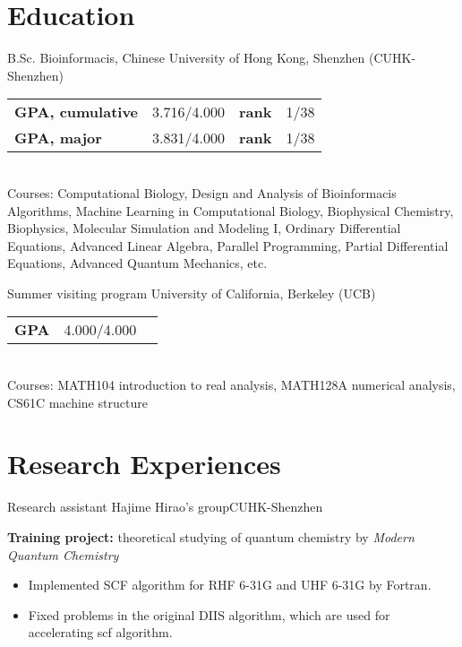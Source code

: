 \documentclass[12pt,a4paper,sans]{moderncv}
\newcommand{\cvsection}[1]{\section{{#1}}}
\begin{document}
\maketitle

\vspace{-1em}
\cvsection{Education}
    {B.Sc.}
    {}
    {Bioinformacis, Chinese University of Hong Kong, Shenzhen (CUHK-Shenzhen)}
    {}
    {\begin{tabular}{@{}lrlr@{}}
        \textbf{GPA, cumulative} & 3.716/4.000 & \textbf{rank} & 1/38\\
        \textbf{GPA, major} & 3.831/4.000      & \textbf{rank} & 1/38
    \end{tabular}\\
    \footnotesize Courses: Computational Biology, Design and Analysis of Bioinformacis Algorithms,
    Machine Learning in Computational Biology, Biophysical Chemistry, Biophysics,
    Molecular Simulation and Modeling I, Ordinary Differential Equations, Advanced Linear Algebra,
    Parallel Programming, Partial Differential Equations, Advanced Quantum Mechanics, etc.}
    {Summer visiting program}
    {}
    {University of California, Berkeley (UCB)}
    {}
    {\begin{tabular}{@{}lrr@{}}
        \textbf{GPA} & 4.000/4.000 &  \\
    \end{tabular}\\
    \footnotesize Courses: MATH104 introduction to real analysis,
    MATH128A numerical analysis, CS61C machine structure\\}


\vspace{-1em}
\cvsection{Research Experiences}
    {Research assistant}{}
    {Hajime Hirao's group}{CUHK-Shenzhen}
    {\small
    \textbf{Training project:} theoretical studying of quantum chemistry by \textit{Modern Quantum Chemistry}
    \begin{itemize}[itemsep=2pt]
        \item Implemented SCF algorithm for RHF 6-31G  and UHF 6-31G  by Fortran.
        \item Fixed problems in the original DIIS algorithm, which are used for accelerating scf algorithm.
    \end{itemize}
}
\end{document}
